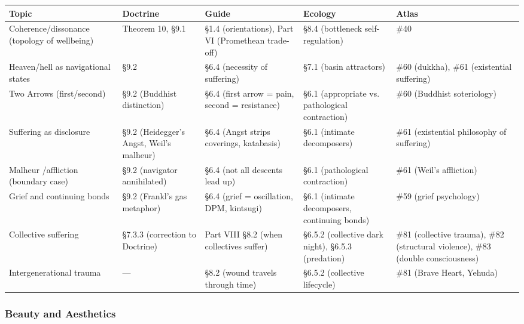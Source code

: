 {\small
\begin{longtable}{>{\raggedright\arraybackslash}p{} >{\raggedright\arraybackslash}p{} >{\raggedright\arraybackslash}p{} >{\raggedright\arraybackslash}p{} >{\raggedright\arraybackslash}p{}}
\toprule
\textbf{Topic} & \textbf{Doctrine} & \textbf{Guide} & \textbf{Ecology} & \textbf{Atlas} \\
\midrule
\endhead
Coherence/\allowbreak dissonance (topology of wellbeing) & Theorem 10, §9.1 & §1.4 (orientations), Part VI (Promethean trade-off) & §8.4 (bottleneck self-regulation) & \#40 \\
Heaven/\allowbreak hell as navigational states & §9.2 & §6.4 (necessity of suffering) & §7.1 (basin attractors) & \#60 (dukkha), \#61 (existential suffering) \\
Two Arrows (first/\allowbreak second) & §9.2 (Buddhist distinction) & §6.4 (first arrow = pain, second = resistance) & §6.1 (appropriate vs. pathological contraction) & \#60 (Buddhist soteriology) \\
Suffering as disclosure & §9.2 (Heidegger's Angst, Weil's malheur) & §6.4 (Angst strips coverings, katabasis) & §6.1 (intimate decomposers) & \#61 (existential philosophy of suffering) \\
Malheur /\allowbreak  affliction (boundary case) & §9.2 (navigator annihilated) & §6.4 (not all descents lead up) & §6.1 (pathological contraction) & \#61 (Weil's affliction) \\
Grief and continuing bonds & §9.2 (Frankl's gas metaphor) & §6.4 (grief = oscillation, DPM, kintsugi) & §6.1 (intimate decomposers, continuing bonds) & \#59 (grief psychology) \\
Collective suffering & §7.3.3 (correction to Doctrine) & Part VIII §8.2 (when collectives suffer) & §6.5.2 (collective dark night), §6.5.3 (predation) & \#81 (collective trauma), \#82 (structural violence), \#83 (double consciousness) \\
Intergenerational trauma & — & §8.2 (wound travels through time) & §6.5.2 (collective lifecycle) & \#81 (Brave Heart, Yehuda) \\
\bottomrule
\end{longtable}
}



\subsubsection*{Beauty and Aesthetics}



